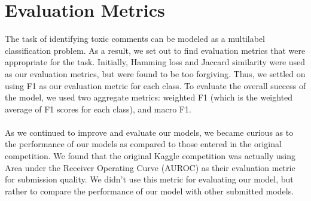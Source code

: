 \documentclass{article}
\begin{document}
\section{Evaluation Metrics}{
  The task of identifying toxic comments can be modeled as a multilabel
  classification problem. As a result, we set out to find evaluation metrics
  that were appropriate for the task. Initially, Hamming loss
  and Jaccard similarity were used as our evaluation metrics, but were found to
  be too forgiving. Thus, we settled on using F1 as our evaluation metric
  for each class. To evaluate the overall success of the
  model, we used two aggregate metrics: weighted F1 (which is the weighted
  average of F1 scores for each class), and macro F1.
  \paragraph{}As we continued to improve and evaluate our models, we became
  curious as to the performance of our models as compared to those entered in
  the original competition. We found that the original Kaggle competition was
  actually using Area under the Receiver Operating Curve (AUROC) as their
  evaluation metric for submission quality. We didn't use this metric for
  evaluating our model, but rather to compare the performance of our model with
  other submitted models.
 }
\end{document}
